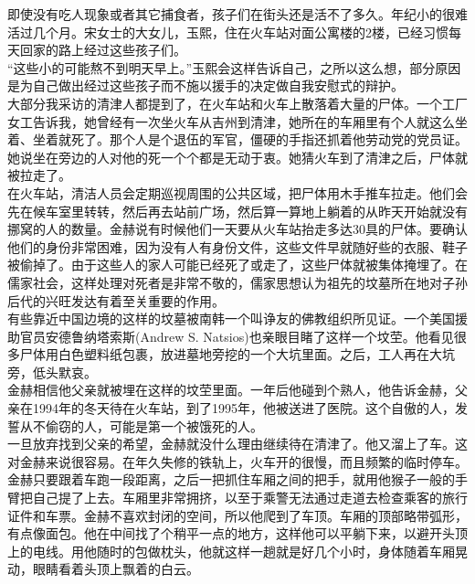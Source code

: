 即使没有吃人现象或者其它捕食者，孩子们在街头还是活不了多久。年纪小的很难活过几个月。宋女士的大女儿，玉熙，住在火车站对面公寓楼的2楼，已经习惯每天回家的路上经过这些孩子们。\\

“这些小的可能熬不到明天早上。”玉熙会这样告诉自己，之所以这么想，部分原因是为自己做出经过这些孩子而不施以援手的决定做自我安慰式的辩护。\\

大部分我采访的清津人都提到了，在火车站和火车上散落着大量的尸体。一个工厂女工告诉我，她曾经有一次坐火车从吉州到清津，她所在的车厢里有个人就这么坐着、坐着就死了。那个人是个退伍的军官，僵硬的手指还抓着他劳动党的党员证。她说坐在旁边的人对他的死一个个都是无动于衷。她猜火车到了清津之后，尸体就被拉走了。\\

在火车站，清洁人员会定期巡视周围的公共区域，把尸体用木手推车拉走。他们会先在候车室里转转，然后再去站前广场，然后算一算地上躺着的从昨天开始就没有挪窝的人的数量。金赫说有时候他们一天要从火车站抬走多达30具的尸体。要确认他们的身份非常困难，因为没有人有身份文件，这些文件早就随好些的衣服、鞋子被偷掉了。由于这些人的家人可能已经死了或走了，这些尸体就被集体掩埋了。在儒家社会，这样处理对死者是非常不敬的，儒家思想认为祖先的坟墓所在地对子孙后代的兴旺发达有着至关重要的作用。\\

有些靠近中国边境的这样的坟墓被南韩一个叫诤友的佛教组织所见证。一个美国援助官员安德鲁纳塔索斯(Andrew S. Natsios)也亲眼目睹了这样一个坟茔。他看见很多尸体用白色塑料纸包裹，放进墓地旁挖的一个大坑里面。之后，工人再在大坑旁，低头默哀。\\

金赫相信他父亲就被埋在这样的坟茔里面。一年后他碰到个熟人，他告诉金赫，父亲在1994年的冬天待在火车站，到了1995年，他被送进了医院。这个自傲的人，发誓从不偷窃的人，可能是第一个被饿死的人。\\

一旦放弃找到父亲的希望，金赫就没什么理由继续待在清津了。他又溜上了车。这对金赫来说很容易。在年久失修的铁轨上，火车开的很慢，而且频繁的临时停车。金赫只要跟着车跑一段距离，之后一把抓住车厢之间的把手，就用他猴子一般的手臂把自己提了上去。车厢里非常拥挤，以至于乘警无法通过走道去检查乘客的旅行证件和车票。金赫不喜欢封闭的空间，所以他爬到了车顶。车厢的顶部略带弧形，有点像面包。他在中间找了个稍平一点的地方，这样他可以平躺下来，以避开头顶上的电线。用他随时的包做枕头，他就这样一趟就是好几个小时，身体随着车厢晃动，眼睛看着头顶上飘着的白云。\\

